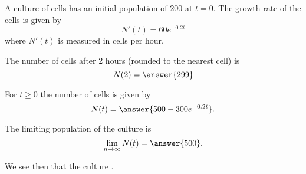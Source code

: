 \documentclass{ximera}
\author{Nela Lakos \and Kyle Parsons}
\begin{document}
\begin{exercise}

A culture of cells has an initial population of 200 at $t=0$.  The growth rate of the cells is given by
\[
N'(t) = 60e^{-0.2t}
\]
where $N'(t)$ is measured in cells per hour.

The  number of cells after 2 hours (rounded to the nearest cell) is
\[
N(2) = \answer{299}
\]

For $t\geq0$ the number of cells is given by
\[
N(t) = \answer{500 - 300e^{-0.2t}}.
\]

The limiting population of the culture is
\[
\lim_{n\to\infty} N(t) = \answer{500}.
\]

We see then that the culture .

\end{exercise}
\end{document}
